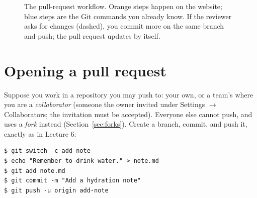 \begin{figure}[H]
\centering
{}
\caption{The pull-request workflow. Orange steps happen on the website; blue steps are the Git commands you already know. If the reviewer asks for changes (dashed), you commit more on the same branch and push; the pull request updates by itself.}
\label{fig:prflow}
\end{figure}

\section{Opening a pull request}

Suppose you work in a repository you may push to: your own, or a team's where you are a \emph{collaborator} (someone the owner invited under Settings $\rightarrow$ Collaborators; the invitation must be accepted). Everyone else cannot push, and uses a \emph{fork} instead (Section~\ref{sec:forks}). Create a branch, commit, and push it, exactly as in Lecture 6:

\begin{lstlisting}
$ git switch -c add-note
$ echo "Remember to drink water." > note.md
$ git add note.md
$ git commit -m "Add a hydration note"
$ git push -u origin add-note
\end{lstlisting}

